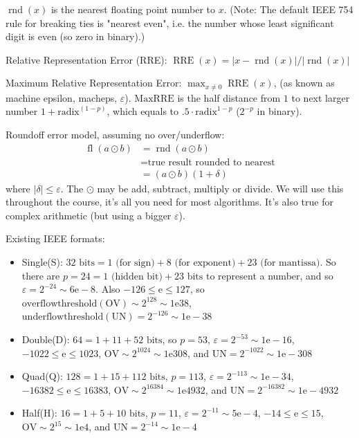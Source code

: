 \documentclass[11pt]{article}
\numberwithin{equation}{section}
\begin{document}
\begin{definition}
    $\operatorname{rnd}(x)$ is the nearest floating point number to $x$. (Note: The default IEEE 754 rule for breaking ties is
    "nearest even", i.e. the number whose least significant digit is even (so zero in binary).)
\end{definition}

\begin{definition}
    Relative Representation Error (RRE): $\operatorname{RRE}(x) = | x - \operatorname{rnd}(x) | / | \operatorname{rnd}(x) |$
\end{definition}

\begin{definition}
    Maximum Relative Representation Error: $\max_{x \neq 0} \operatorname{RRE}(x)$, (as known as machine epsilon, macheps, $\varepsilon$).
    $\mathrm{MaxRRE}$ is the half distance from $1$ to next larger number $1+\mathrm{radix}^(1-p)$, which equals to $.5\cdot \mathrm{radix}^{1-p}$ ($2^{-p}$ in binary).
\end{definition}

Roundoff error model, assuming no over/underflow: \begin{align*}
    \operatorname{fl}(a \odot b) &= \operatorname{rnd}(a \odot b) \\
    &= \text{true result rounded to nearest} \\
    &= (a \odot b)(1 + \delta)
\end{align*}
where $|\delta| \leq \varepsilon$. The $\odot$ may be add, subtract, multiply or divide. We will use this throughout the course, 
it's all you need for most algorithms. It's also true for complex arithmetic (but using a bigger $\varepsilon$).

Existing IEEE formats:\begin{itemize}
    \item Single(S): $32 \text{ bits} = 1 \text{ (for sign)} + 8 \text{ (for exponent)} + 23 \text{ (for mantissa)}$.
    So there are $p = 24 = 1 \text{ (hidden bit)} + 23 \text{ bits}$ to represent a number, and so $\varepsilon = 2^{-24} \sim 6\mathrm{e}-8$.
    Also $-126 \leq \mathrm{e} \leq 127$, so $\mathrm{overflow threshold (OV)} \sim 2^{128} \sim 1\mathrm{e}38$, $\mathrm{underflow threshold (UN)} = 2^{-126} \sim 1\mathrm{e}-38$
    \item Double(D): $64=1+11+52\text{ bits}$, so $p=53$, $\varepsilon = 2^{-53} \sim 1\mathrm{e}-16$, $-1022 \leq \mathrm{e} \leq 1023$, $\mathrm{OV} \sim  2^{1024} \sim 1\mathrm{e}308$, 
    and $\mathrm{UN} = 2^{-1022} \sim 1\mathrm{e}-308$
    \item Quad(Q): $128=1+15+112 \text{ bits}$, $p = 113$, $\varepsilon = 2^{-113} \sim 1\mathrm{e}-34$, $-16382 \leq \mathrm{e} \leq 16383$, 
    $\mathrm{OV} \sim 2^{16384} \sim 1\mathrm{e}4932$, and $\mathrm{UN} = 2^{-16382} \sim 1\mathrm{e}-4932$
    \item Half(H): $16=1+5+10 \text{ bits}$, $p = 11$, $\varepsilon = 2^{-11} \sim 5\mathrm{e}-4$, $-14 \leq \mathrm{e} \leq 15$, $\mathrm{OV} \sim 2^{15} \sim 1\mathrm{e}4$, and $\mathrm{UN} = 2^{-14} \sim 1\mathrm{e}-4$ 
\end{itemize}
\end{document}
